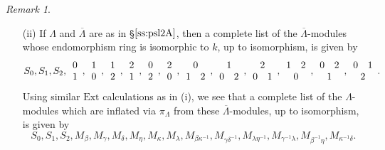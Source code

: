 \documentclass{amsart}
\theoremstyle{plain}
\theoremstyle{definition}
\theoremstyle{remark}
\newtheorem{rem}[thm]{Remark}
\begin{document}
\begin{rem}
\begin{enumerate}
\item[(ii)] If $\Lambda$ and $\overline{\Lambda}$ are as in \S$\ref{ss:psl2A}$, then a complete list of the 
$\overline{\Lambda}$-modules whose endomorphism ring is isomorphic to $k$, up to isomorphism, is given by
$$S_0,S_1, S_2,  \begin{array}{c}0\\1\end{array}, \begin{array}{c}1\\0\end{array}, 
\begin{array}{c}1\\2\end{array},\begin{array}{c}2\\1\end{array},
\begin{array}{c}0\\2\end{array},\begin{array}{c}2\\0\end{array},
\begin{array}{cc}\multicolumn{2}{c}{0}\\1&2\end{array}, 
\begin{array}{cc}\multicolumn{2}{c}{1}\\0&2\end{array}, 
\begin{array}{cc}\multicolumn{2}{c}{2}\\0&1\end{array}, 
\begin{array}{cc}1&2\\\multicolumn{2}{c}{0}\end{array},
\begin{array}{cc}0&2\\\multicolumn{2}{c}{1}\end{array},
\begin{array}{cc}0&1\\\multicolumn{2}{c}{2}\end{array}.$$
Using similar $\mathrm{Ext}$ calculations as in (i), we see that
a complete list of the $\Lambda$-modules which are inflated via $\pi_\Lambda$
from these $\overline{\Lambda}$-modules, up to isomorphism, is given by
$$S_0,S_1, S_2, M_\beta, M_\gamma, M_\delta, M_\eta, M_\kappa, M_\lambda,
M_{\beta\kappa^{-1}}, M_{\gamma\delta^{-1}}, M_{\lambda\eta^{-1}},
M_{\gamma^{-1}\lambda}, M_{\beta^{-1}\eta}, M_{\kappa^{-1}\delta}.$$


\end{enumerate}
\end{rem}
\end{document}
